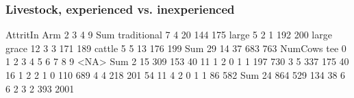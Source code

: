 \subsubsection{Livestock, experienced vs. inexperienced}


\begin{Schunk}
\begin{Soutput}
             AttritIn
Arm             2   3   4   9 Sum
  traditional   7   4  20 144 175
  large         5   2   1 192 200
  large grace  12   3   3 171 189
  cattle        5   5  13 176 199
  Sum          29  14  37 683 763
     NumCows
tee      0    1    2    3    4    5    6    7    8    9 <NA>  Sum
  2     15  309  153   40   11    1    2    0    1    1  197  730
  3      5  337  175   40   16    1    2    2    1    0  110  689
  4      4  218  201   54   11    4    2    0    1    1   86  582
  Sum   24  864  529  134   38    6    6    2    3    2  393 2001
\end{Soutput}
\end{Schunk}





